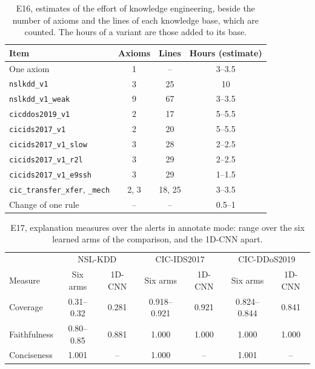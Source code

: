 

\begin{table}[htbp]
\centering
\footnotesize
\caption{E16, estimates of the effort of knowledge engineering, beside the number of axioms and the lines of each
knowledge base, which are counted. The hours of a variant are those added to its base.}
\label{tab:app-e16}
\setlength{\tabcolsep}{4pt}
\begin{tabular}{@{}lccc@{}}
\toprule
Item & Axioms & Lines & Hours (estimate) \\
\midrule
One axiom                                    & 1    & --     & 3--3.5 \\
\texttt{nslkdd\_v1}                          & 3    & 25     & 10 \\
\texttt{nslkdd\_v1\_weak}                    & 9    & 67     & 3--3.5 \\
\texttt{cicddos2019\_v1}                     & 2    & 17     & 5--5.5 \\
\texttt{cicids2017\_v1}                      & 2    & 20     & 5--5.5 \\
\texttt{cicids2017\_v1\_slow}                & 3    & 28     & 2--2.5 \\
\texttt{cicids2017\_v1\_r2l}                 & 3    & 29     & 2--2.5 \\
\texttt{cicids2017\_v1\_e9ssh}               & 3    & 29     & 1--1.5 \\
\texttt{cic\_transfer\_xfer}, \texttt{\_mech} & 2, 3 & 18, 25 & 3--3.5 \\
Change of one rule                           & --   & --     & 0.5--1 \\
\bottomrule
\end{tabular}
\end{table}

\begin{table}[htbp]
\centering
\footnotesize
\caption{E17, explanation measures over the alerts in annotate mode: range over the six learned arms of the
comparison, and the 1D-CNN apart.}
\label{tab:app-e17}
\setlength{\tabcolsep}{4pt}
\begin{tabular}{@{}lcccccc@{}}
\toprule
 & \multicolumn{2}{c}{NSL-KDD} & \multicolumn{2}{c}{CIC-IDS2017} & \multicolumn{2}{c}{CIC-DDoS2019} \\
Measure & Six arms & 1D-CNN & Six arms & 1D-CNN & Six arms & 1D-CNN \\
\midrule
Coverage     & 0.31--0.32 & 0.281 & 0.918--0.921 & 0.921 & 0.824--0.844 & 0.841 \\
Faithfulness & 0.80--0.85 & 0.881 & 1.000        & 1.000 & 1.000        & 1.000 \\
Conciseness  & 1.001      & --    & 1.000        & --    & 1.001        & -- \\
\bottomrule
\end{tabular}
\end{table}

